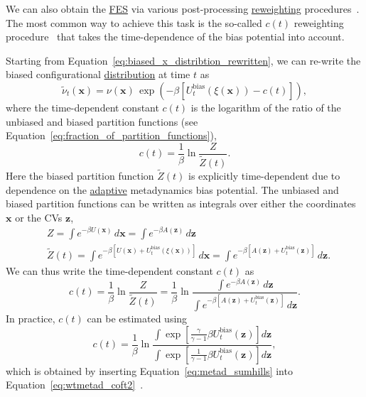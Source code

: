 \documentclass[9pt,review]{livecoms}
\newcommand{\vx}{\mathbf{x}}
\newcommand{\vz}{\mathbf{z}}
\begin{document}
We can also obtain the \hyperlink{ref:FES} {FES} via various post-processing \hyperlink{ref:Reweighting} {reweighting} procedures~\cite{bonomi_rewt,tiwary_rewt,Branduardi-JCTC-2012,Schafer_RewMetaD_2020,Giberti_IterRew_JCTC2019,10.1063/1.5123498,10.1016/j.cplett.2020.137384}. The most common way to achieve this task is the so-called $c(t)$ reweighting procedure~\cite{bonomi_rewt,tiwary_rewt} that takes the time-dependence of the bias potential into account. 

Starting from Equation~\ref{eq:biased_x_distribtion_rewritten}, we can re-write the biased configurational \hyperlink{ref:Distribution} {distribution} at time $t$ as 
\begin{equation}
\label{eq:biased_prob_dist_with_c_of_t}
\tilde{\nu}_{t}(\vx) = \nu(\vx) \, \exp
\left(-\beta\left[
U_{t}^{\mathrm{bias}}(\xi(\vx))-c(t)
\right] \right),
\end{equation}
where the time-dependent constant $c(t)$ is the logarithm of the ratio of the unbiased and biased partition functions (see Equation~\ref{eq:fraction_of_partition_functions}),
\begin{equation}
c(t) = 
\frac{1}{\beta} \ln \frac{Z}{\tilde{Z}(t)}.
\end{equation}
Here the biased partition function $\tilde{Z}(t)$ is explicitly time-dependent due to dependence on the \hyperlink{ref:Adaptive} {adaptive} metadynamics bias potential. 
The unbiased and biased partition functions can be written as integrals over either the coordinates $\vx$ or the CVs $\vz$, 
\begin{align}
& Z = \int e^{-\beta U(\vx) } \, d\vx = \int e^{-\beta A(\vz) } \, d\vz \\
& \tilde{Z}(t) = \int e^{-\beta\left [ U(\vx) + U_{t}^\mathrm{bias}(\xi(\vx)) \right]} \, d\vx = \int e^{-\beta\left [ A(\vz) + U_{t}^\mathrm{bias}(\vz) \right]} \, d\vz.
\end{align}
We can thus write the time-dependent constant $c(t)$ as \begin{equation}
\label{eq:wtmetad_coft2}
c(t) = 
\frac{1}{\beta} \ln \frac{Z}{\tilde{Z}(t)} = 
\frac{1}{\beta} \ln \frac
{\int e^{-\beta A(\vz)} \,  d\vz }
{\int e^{-\beta \left[ A(\vz) + U_{t}^{\mathrm{bias}}(\vz) \right]} \, d\vz }.
\end{equation}
In practice, $c(t)$ can be estimated using
\begin{equation}
\label{eq:wtmetad_coft_estimate}
c(t) = \frac{1}{\beta} \ln
\frac
{\int \exp \left[ \frac{\gamma}{\gamma-1} \beta U_{t}^{\mathrm{bias}}(\vz)  \right] d\vz }
{\int \exp \left[ \frac{1}{\gamma-1} \beta U_{t}^{\mathrm{bias}}(\vz)  \right] d\vz },
\end{equation}
which is obtained by inserting Equation~\ref{eq:metad_sumhills} into Equation~\ref{eq:wtmetad_coft2}~\cite{tiwary_rewt,Valsson2016_ARPC_MetaD}. 
\end{document}

